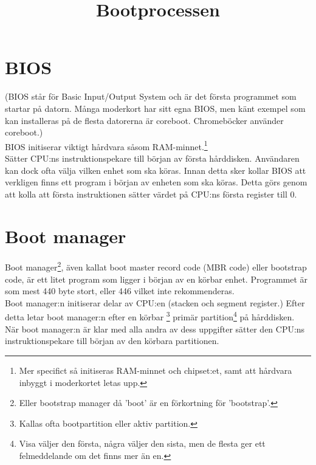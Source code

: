 \documentclass[12pt,a4paper]{article}
\begin{document}
\title{\Huge{\textbf{Bootprocessen}}}
\date{}
\author{}
\maketitle


\section*{BIOS}

(BIOS står för Basic Input/Output System och är det
första programmet som startar på datorn. Många moderkort
har sitt egna BIOS, men känt exempel som kan installeras
på de flesta datorerna är coreboot. Chromeböcker använder
coreboot.)
\\

\noindent
BIOS initiserar viktigt hårdvara såsom RAM-minnet.\footnote{Mer
specifict så initiseras RAM-minnet och chipset:et,
samt att hårdvara inbyggt i moderkortet letas upp.}
\\

\noindent
Sätter CPU:ns instruktionspekare till början av första hårddisken.
Användaren kan dock ofta välja vilken enhet som ska köras.
Innan detta sker kollar BIOS att verkligen finns ett program
i början av enheten som ska köras. Detta görs genom att kolla
att första instruktionen sätter värdet på CPU:ns första register
till 0.
\\


\section*{Boot manager}

Boot manager\footnote{Eller bootstrap manager då 'boot' är en
förkortning för 'bootstrap'.}, även kallat boot master record
code (MBR code) eller bootstrap code, är ett litet program
som ligger i början av en körbar enhet. Programmet är som mest
440 byte stort, eller 446 vilket inte rekommenderas.
\\

\noindent
Boot manager:n initiserar delar av CPU:en (stacken och segment
register.) Efter detta letar boot manager:n efter en körbar
\footnote{Kallas ofta bootpartition eller aktiv partition.}
primär partition\footnote{Visa väljer den första, några väljer
den sista, men de flesta ger ett felmeddelande om det finns mer
än en.} på hårddisken.
\\

\noindent
När boot manager:n är klar med alla andra av dess uppgifter
sätter den CPU:ns instruktionspekare till början av den körbara
partitionen.
\end{document}
